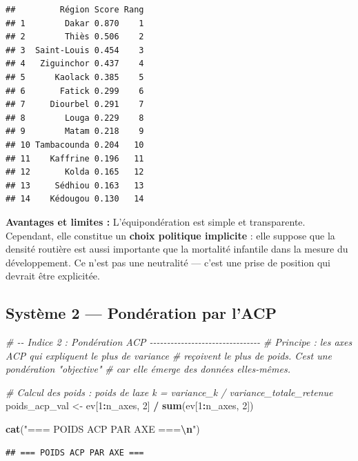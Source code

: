 \documentclass[
]{article}
\newenvironment{Shaded}{\begin{snugshade}}{\end{snugshade}}
\newcommand{\CommentTok}[1]{\textcolor[rgb]{0.56,0.35,0.01}{\textit{#1}}}
\newcommand{\DecValTok}[1]{\textcolor[rgb]{0.00,0.00,0.81}{#1}}
\newcommand{\FunctionTok}[1]{\textcolor[rgb]{0.13,0.29,0.53}{\textbf{#1}}}
\newcommand{\NormalTok}[1]{#1}
\newcommand{\OtherTok}[1]{\textcolor[rgb]{0.56,0.35,0.01}{#1}}
\newcommand{\SpecialCharTok}[1]{\textcolor[rgb]{0.81,0.36,0.00}{\textbf{#1}}}
\newcommand{\StringTok}[1]{\textcolor[rgb]{0.31,0.60,0.02}{#1}}
\begin{document}
\begin{verbatim}
##         Région Score Rang
## 1        Dakar 0.870    1
## 2        Thiès 0.506    2
## 3  Saint-Louis 0.454    3
## 4   Ziguinchor 0.437    4
## 5      Kaolack 0.385    5
## 6       Fatick 0.299    6
## 7     Diourbel 0.291    7
## 8        Louga 0.229    8
## 9        Matam 0.218    9
## 10 Tambacounda 0.204   10
## 11    Kaffrine 0.196   11
## 12       Kolda 0.165   12
## 13     Sédhiou 0.163   13
## 14    Kédougou 0.130   14
\end{verbatim}

\textbf{Avantages et limites :} L'équipondération est simple et
transparente. Cependant, elle constitue un \textbf{choix politique
implicite} : elle suppose que la densité routière est aussi importante
que la mortalité infantile dans la mesure du développement. Ce n'est pas
une neutralité --- c'est une prise de position qui devrait être
explicitée.

\subsection{Système 2 --- Pondération par
l'ACP}\label{systuxe8me-2-ponduxe9ration-par-lacp}

\begin{Shaded}
\begin{Highlighting}[]
\CommentTok{\# {-}{-} Indice 2 : Pondération ACP {-}{-}{-}{-}{-}{-}{-}{-}{-}{-}{-}{-}{-}{-}{-}{-}{-}{-}{-}{-}{-}{-}{-}{-}{-}{-}{-}{-}{-}{-}{-}{-}}
\CommentTok{\# Principe : les axes ACP qui expliquent le plus de variance}
\CommentTok{\# reçoivent le plus de poids. C\textquotesingle{}est une pondération "objective"}
\CommentTok{\# car elle émerge des données elles{-}mêmes.}

\CommentTok{\# Calcul des poids : poids de l\textquotesingle{}axe k = variance\_k / variance\_totale\_retenue}
\NormalTok{poids\_acp\_val }\OtherTok{\textless{}{-}}\NormalTok{ ev[}\DecValTok{1}\SpecialCharTok{:}\NormalTok{n\_axes, }\DecValTok{2}\NormalTok{] }\SpecialCharTok{/} \FunctionTok{sum}\NormalTok{(ev[}\DecValTok{1}\SpecialCharTok{:}\NormalTok{n\_axes, }\DecValTok{2}\NormalTok{])}

\FunctionTok{cat}\NormalTok{(}\StringTok{"=== POIDS ACP PAR AXE ===}\SpecialCharTok{\textbackslash{}n}\StringTok{"}\NormalTok{)}
\end{Highlighting}
\end{Shaded}

\begin{verbatim}
## === POIDS ACP PAR AXE ===
\end{verbatim}
\end{document}
